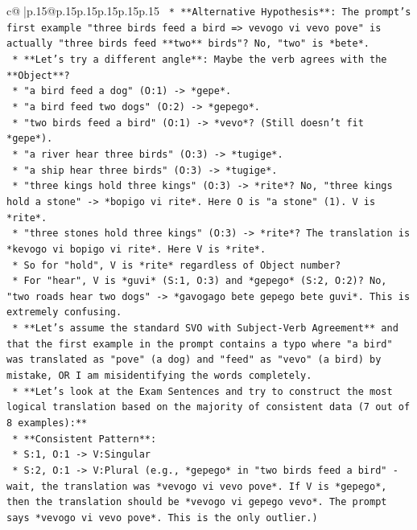 \documentclass{article}
\begin{document}
{\begin{supertabular}{c@{$\;$}|p{.15\linewidth}@{}p{.15\linewidth}p{.15\linewidth}p{.15\linewidth}p{.15\linewidth}p{.15\linewidth}}
{{{\texttt{        *   **Alternative Hypothesis**: The prompt's first example "three birds feed a bird => vevogo vi vevo pove" is actually "three birds feed **two** birds"? No, "two" is *bete*.} \\
\texttt{        *   **Let's try a different angle**: Maybe the verb agrees with the **Object**?} \\
\texttt{            *   "a bird feed a dog" (O:1) {-}> *gepe*.} \\
\texttt{            *   "a bird feed two dogs" (O:2) {-}> *gepego*.} \\
\texttt{            *   "two birds feed a bird" (O:1) {-}> *vevo*? (Still doesn't fit *gepe*).} \\
\texttt{            *   "a river hear three birds" (O:3) {-}> *tugige*.} \\
\texttt{            *   "a ship hear three birds" (O:3) {-}> *tugige*.} \\
\texttt{            *   "three kings hold three kings" (O:3) {-}> *rite*? No, "three kings hold a stone" {-}> *bopigo vi rite*. Here O is "a stone" (1). V is *rite*.} \\
\texttt{            *   "three stones hold three kings" (O:3) {-}> *rite*? The translation is *kevogo vi bopigo vi rite*. Here V is *rite*.} \\
\texttt{            *   So for "hold", V is *rite* regardless of Object number?} \\
\texttt{            *   For "hear", V is *guvi* (S:1, O:3) and *gepego* (S:2, O:2)? No, "two roads hear two dogs" {-}> *gavogago bete gepego bete guvi*. This is extremely confusing.} \\
\texttt{        *   **Let's assume the standard SVO with Subject{-}Verb Agreement** and that the first example in the prompt contains a typo where "a bird" was translated as "pove" (a dog) and "feed" as "vevo" (a bird) by mistake, OR I am misidentifying the words completely.} \\
\texttt{        *   **Let's look at the Exam Sentences and try to construct the most logical translation based on the majority of consistent data (7 out of 8 examples):**} \\
\texttt{            *   **Consistent Pattern**:} \\
\texttt{                *   S:1, O:1 {-}> V:Singular} \\
\texttt{                *   S:2, O:1 {-}> V:Plural (e.g., *gepego* in "two birds feed a bird" {-} wait, the translation was *vevogo vi vevo pove*. If V is *gepego*, then the translation should be *vevogo vi gepego vevo*. The prompt says *vevogo vi vevo pove*. This is the only outlier.)} \\
}}}
\end{supertabular}}
\end{document}
